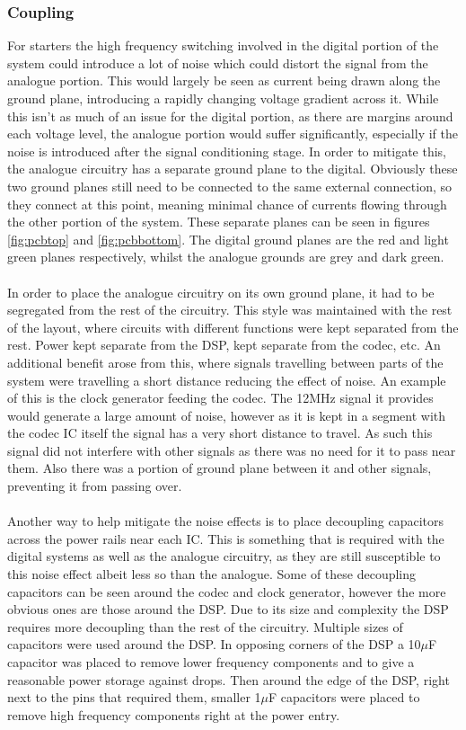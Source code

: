 \subsubsection{Coupling}
For starters the high frequency switching involved in the digital portion of the system could introduce a lot of noise which could distort the signal from the analogue portion.
This would largely be seen as current being drawn along the ground plane, introducing a rapidly changing voltage gradient across it.
While this isn't as much of an issue for the digital portion, as there are margins around each voltage level, the analogue portion would suffer significantly, especially if the noise is introduced after the signal conditioning stage.
In order to mitigate this, the analogue circuitry has a separate ground plane to the digital.
Obviously these two ground planes still need to be connected to the same external connection, so they connect at this point, meaning minimal chance of currents flowing through the other portion of the system.
These separate planes can be seen in figures \ref{fig:pcbtop} and \ref{fig:pcbbottom}.
The digital ground planes are the red and light green planes respectively, whilst the analogue grounds are grey and dark green.
\\
\\
In order to place the analogue circuitry on its own ground plane, it had to be segregated from the rest of the circuitry.
This style was maintained with the rest of the layout, where circuits with different functions were kept separated from the rest.
Power kept separate from the DSP, kept separate from the codec, etc.
An additional benefit arose from this, where signals travelling between parts of the system were travelling a short distance reducing the effect of noise.
An example of this is the clock generator feeding the codec.
The 12MHz signal it provides would generate a large amount of noise, however as it is kept in a segment with the codec IC itself the signal has a very short distance to travel.
As such this signal did not interfere with other signals as there was no need for it to pass near them.
Also there was a portion of ground plane between it and other signals, preventing it from passing over.
\\
\\
Another way to help mitigate the noise effects is to place decoupling capacitors across the power rails near each IC.
This is something that is required with the digital systems as well as the analogue circuitry, as they are still susceptible to this noise effect albeit less so than the analogue.
Some of these decoupling capacitors can be seen around the codec and clock generator, however the more obvious ones are those around the DSP.
Due to its size and complexity the DSP requires more decoupling than the rest of the circuitry.
Multiple sizes of capacitors were used around the DSP.
In opposing corners of the DSP a 10$\mu$F capacitor was placed to remove lower frequency components and to give a reasonable power storage against drops.
Then around the edge of the DSP, right next to the pins that required them, smaller 1$\mu$F capacitors were placed to remove high frequency components right at the power entry.



